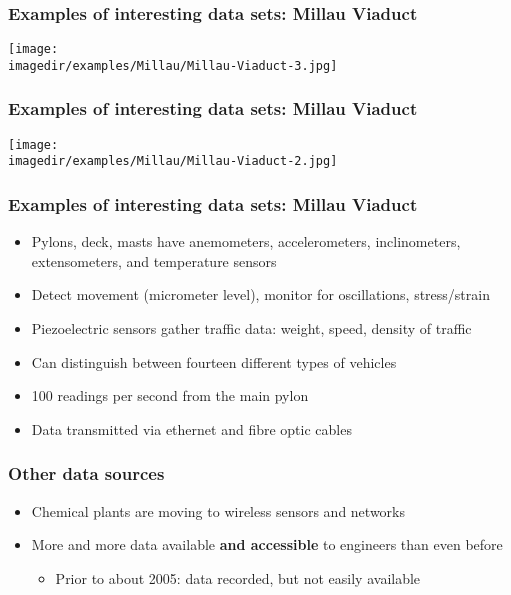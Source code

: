 \begin{frame}\frametitle{Examples of interesting data sets: Millau Viaduct}

	\texttt{[image: \\imagedir/examples/Millau/Millau-Viaduct-3.jpg]}
\end{frame}

\begin{frame}\frametitle{Examples of interesting data sets: Millau Viaduct}

	\texttt{[image: \\imagedir/examples/Millau/Millau-Viaduct-2.jpg]}
\end{frame}

\begin{frame}\frametitle{Examples of interesting data sets: Millau Viaduct}
	\begin{itemize}
		\item	Pylons, deck, masts have anemometers, accelerometers, inclinometers, extensometers, and temperature sensors
		\item	Detect movement (micrometer level), monitor for oscillations, stress/strain
		\item	Piezoelectric sensors gather traffic data: weight, speed, density of traffic
		\item	Can distinguish between fourteen different types of vehicles
		\item	100 readings per second from the main pylon
		\item	Data transmitted via ethernet and fibre optic cables
	\end{itemize}
\end{frame}

\begin{frame}\frametitle{Other data sources}
	\begin{itemize}
		\item	Chemical plants are moving to wireless sensors and networks
		\item	More and more data available \textbf{and accessible} to engineers than even before
		\begin{itemize}
			\item	Prior to about 2005: data recorded, but not easily available
		\end{itemize}
	\end{itemize}
\end{frame}

